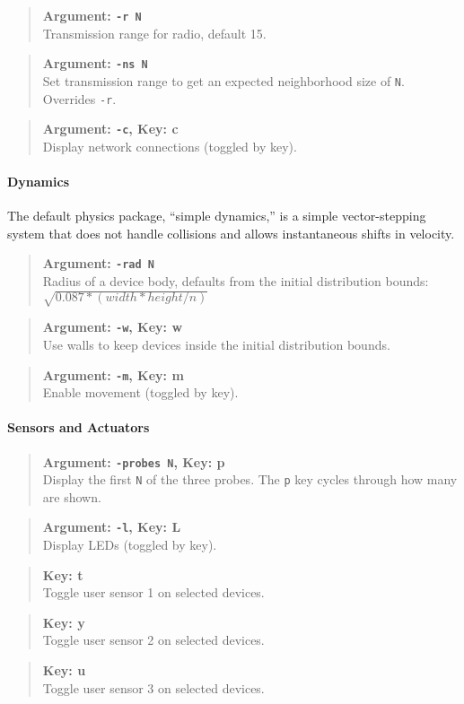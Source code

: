 \documentclass{article}
\newcommand\var[1]{{\tt #1}}
\newcommand\key[1]{{\bf #1}}
\newcommand\simarg[2]{\begin{quote} {\bf Argument: \var{#1}} \\ #2 \end{quote}}
\newcommand\simkey[2]{\begin{quote} {\bf Key: \key{#1}} \\ #2 \end{quote}}
\newcommand\simargkey[3]{
  \begin{quote} {\bf Argument: \var{#1}, Key: \key{#2}} \\ #3 \end{quote}
}
\begin{document}
\simarg{-r N}{Transmission range for radio, default 15.}
\simarg{-ns N}{Set transmission range to get an expected neighborhood
  size of \var{N}.  Overrides \var{-r}.}
\simargkey{-c}{c}{Display network connections (toggled by key).}

\paragraph{Dynamics}
The default physics package, ``simple dynamics,'' is a simple
vector-stepping system that does not handle collisions and allows
instantaneous shifts in velocity.

\simarg{-rad N}{Radius of a device body, defaults from the initial
  distribution bounds: $\sqrt{0.087*(width*height/n)}$}
\simargkey{-w}{w}{Use walls to keep devices inside the initial distribution
  bounds.}
\simargkey{-m}{m}{Enable movement (toggled by key).}

\paragraph{Sensors and Actuators}
\simargkey{-probes N}{p}{Display the first \var{N} of the three probes.  
  The \var{p} key cycles through how many are shown.}
\simargkey{-l}{L}{Display LEDs (toggled by key).}
\simkey{t}{Toggle user sensor 1 on selected devices.}
\simkey{y}{Toggle user sensor 2 on selected devices.}
\simkey{u}{Toggle user sensor 3 on selected devices.}
\end{document}
